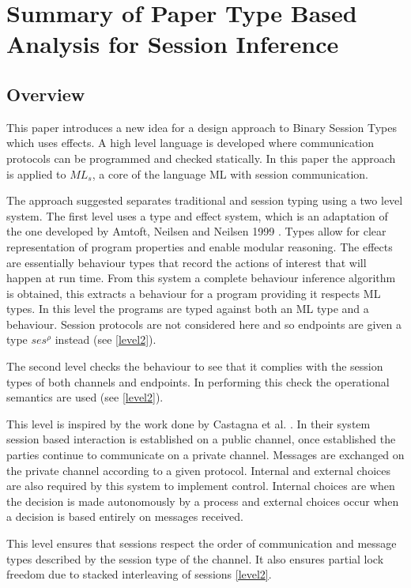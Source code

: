 \chapter{Summary of Paper Type Based Analysis for Session Inference}

\section{Overview} \label{overview}
This paper introduces a new idea for a design approach to Binary Session Types which uses effects. A high level language is developed where communication protocols can be programmed and checked statically. In this paper \cite{paper1} the approach is applied to $ML_s$, a core of the language ML with session communication.

The approach suggested separates traditional and session typing using a two level system. The first level uses a type and effect system, which is an adaptation of the one developed by Amtoft, Neilsen and Neilsen 1999 \cite{amtoft}. Types allow for clear representation of program properties and enable modular reasoning. The effects are essentially behaviour types that record the actions of interest that will happen at run time. From this system a complete behaviour inference algorithm is obtained, this extracts a behaviour for a program providing it respects ML types. In this level the programs are typed against both an ML type and a behaviour. Session protocols are not considered here and so endpoints are given a type $ses^\rho$ instead (see \ref{level2}).   

The second level checks the behaviour to see that it complies with the session types of both channels and endpoints. In performing this check the operational semantics are used (see \ref{level2}). 

This level is inspired by the work done by Castagna et al. \cite{foundSessTypes}. In their system session based interaction is established on a public channel, once established the parties continue to communicate on a private channel. Messages are exchanged on the private channel according to a given protocol. Internal and external choices are also required by this system to implement control. Internal choices are when the decision is made autonomously by a process and external choices occur when a decision is based entirely on messages received. 

This level ensures that sessions respect the order of communication and message types described by the session type of the channel. It also ensures partial lock freedom due to stacked interleaving of sessions \ref{level2}.

